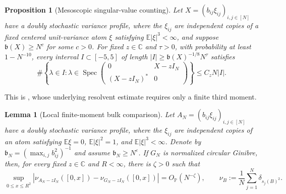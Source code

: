 \documentclass[11pt,reqno]{amsart}
\numberwithin{equation}{section}
\newtheorem{proposition}[theorem]{Proposition}
\newtheorem{lemma}[theorem]{Lemma}
\theoremstyle{definition}
\theoremstyle{remark}
\newcommand{\C}{\mathbb C}
\newcommand{\E}{\mathbb E}
\newcommand{\Pp}{\mathbb P}
\newcommand{\1}{\mathbf 1}
\begin{document}
\begin{proposition}[Mesoscopic singular-value counting]
\label{prop:mesoscopic-counting}
Let $X=(b_{ij}\xi_{ij})_{i,j\in[N]}$ have a doubly stochastic variance
profile, where the $\xi_{ij}$ are independent copies of a fixed centered
unit-variance atom $\xi$ satisfying $\E|\xi|^3<\infty$, and suppose
$\mathfrak b(X)\ge N^{c}$ for some $c>0$.  For fixed $z\in\C$ and
$\tau>0$, with probability at
least $1-N^{-10}$, every interval $I\subset[-5,5]$ of length
$|I|\ge\mathfrak b(X)^{-1/8}N^\tau$ satisfies
\[
 \#\left\{\lambda\in I:\lambda\in\operatorname{Spec}
 \begin{pmatrix}0&X-zI_N\\(X-zI_N)^*&0\end{pmatrix}\right\}
 \le C_zN|I|.
\]
\end{proposition}

This is \cite[Corollary~3.5]{Han2410}, whose underlying resolvent estimate
\cite[Proposition~3.4]{Han2410} requires only a finite third moment.

\begin{lemma}[Local finite-moment bulk comparison]
\label{lem:local-finite-moment-bulk}
Let $A_N=(b_{ij}\xi_{ij})_{i,j\in[N]}$ have a doubly stochastic variance profile, where
the $\xi_{ij}$ are independent copies of an atom satisfying
$\E\xi=0$, $\E|\xi|^2=1$, and $\E|\xi|^3<\infty$.  Denote by
$\mathfrak b_N=(\max_{i,j}b_{ij}^2)^{-1}$ and assume
$\mathfrak b_N\ge N^\varepsilon$.  If $G_N$ is normalized circular
Ginibre, then, for every fixed $z\in\C$ and $R<\infty$, there is
$\zeta>0$ such that
\begin{equation}\label{eq:local-finite-moment-bulk}
 \sup_{0\le x\le R^2}
 \left|\nu_{A_N-zI_N}([0,x])-\nu_{G_N-zI_N}([0,x])\right|
 =O_{\Pp}(N^{-\zeta}),
 \qquad
 \nu_B:=\frac1N\sum_{j=1}^N\delta_{s_j(B)^2}.
\end{equation}
\end{lemma}
\end{document}
